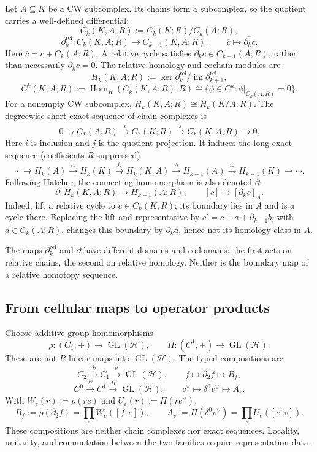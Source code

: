 Let $A\subseteq K$ be a CW subcomplex. Its chains form a subcomplex,
so the quotient carries a well-defined differential:
\[
 C_k(K,A;R):=C_k(K;R)/C_k(A;R),
\]
\[
 \partial_k^{\mathrm{rel}}:C_k(K,A;R)\longrightarrow C_{k-1}(K,A;R),
 \qquad \overline c\longmapsto\overline{\partial_kc}.
\]
Here $\overline c=c+C_k(A;R)$. A relative cycle satisfies
$\partial_kc\in C_{k-1}(A;R)$, rather than necessarily $\partial_kc=0$.
The relative homology and cochain modules are
\[
 H_k(K,A;R):=\ker\partial_k^{\mathrm{rel}}
 /\operatorname{im}\partial_{k+1}^{\mathrm{rel}},
\]
\[
 C^k(K,A;R):=\operatorname{Hom}_R(C_k(K,A;R),R)
 \cong\{\phi\in C^k:\phi|_{C_k(A;R)}=0\}.
\]
For a nonempty CW subcomplex,
$H_k(K,A;R)\cong\widetilde H_k(K/A;R)$.
The degreewise short exact sequence of chain complexes is
\[
 0\longrightarrow C_*(A;R)\xrightarrow{\ i\ }C_*(K;R)
 \xrightarrow{\ j\ }C_*(K,A;R)\longrightarrow0.
\]
Here $i$ is inclusion and $j$ is the quotient projection.
It induces the long exact sequence (coefficients $R$ suppressed)
\[
 \cdots\longrightarrow H_k(A)\xrightarrow{i_*}H_k(K)
 \xrightarrow{j_*}H_k(K,A)\xrightarrow{\partial}
 H_{k-1}(A)\xrightarrow{i_*}H_{k-1}(K)\longrightarrow\cdots.
\]
Following Hatcher, the connecting homomorphism is also denoted
$\partial$:
\[
 \partial:H_k(K,A;R)\longrightarrow H_{k-1}(A;R),
 \qquad [\overline c]\longmapsto[\partial_kc]_A.
\]
Indeed, lift a relative cycle to $c\in C_k(K;R)$; its boundary lies in
$A$ and is a cycle there. Replacing the lift and representative by
$c'=c+a+\partial_{k+1}b$, with $a\in C_k(A;R)$, changes this boundary
by $\partial_ka$, hence not its homology class in $A$.

The maps $\partial_k^{\mathrm{rel}}$ and $\partial$ have different domains
and codomains: the first acts on relative chains, the second on relative
homology. Neither is the boundary map of a relative homotopy sequence.

\subsection*{From cellular maps to operator products}

Choose additive-group homomorphisms
\[
 \rho:(C_1,+)\longrightarrow\operatorname{GL}(\mathcal H),
 \qquad \Pi:(C^1,+)\longrightarrow\operatorname{GL}(\mathcal H).
\]
These are not $R$-linear maps into $\operatorname{GL}(\mathcal H)$.
The typed compositions are
\[
 C_2\xrightarrow{\partial_2}C_1\xrightarrow{\rho}\operatorname{GL}(\mathcal H),
 \qquad f\longmapsto\partial_2f\longmapsto B_f,
\]
\[
 C^0\xrightarrow{\delta^0}C^1\xrightarrow{\Pi}\operatorname{GL}(\mathcal H),
 \qquad v^\vee\longmapsto\delta^0v^\vee\longmapsto A_v.
\]
With $W_e(r):=\rho(re)$ and $U_e(r):=\Pi(re^\vee)$,
\[
 B_f:=\rho(\partial_2f)=\prod_e W_e([f:e]),
 \qquad A_v:=\Pi(\delta^0v^\vee)=\prod_e U_e([e:v]).
\]
These compositions are neither chain complexes nor exact sequences.
Locality, unitarity, and commutation between the two families require
representation data.

